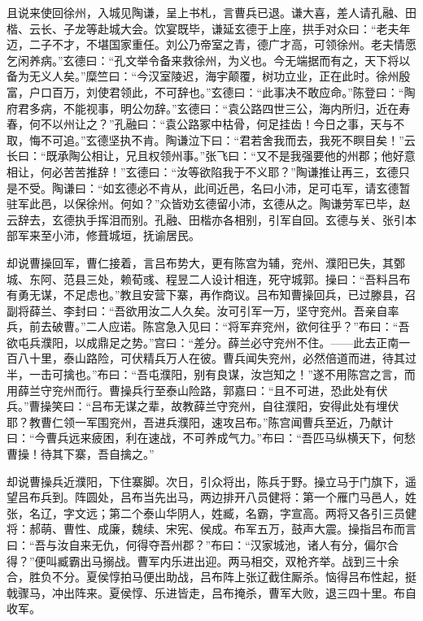 且说来使回徐州，入城见陶谦，呈上书札，言曹兵已退。谦大喜，差人请孔融、田楷、云长、子龙等赴城大会。饮宴既毕，谦延玄德于上座，拱手对众曰：“老夫年迈，二子不才，不堪国家重任。刘公乃帝室之青，德广才高，可领徐州。老夫情愿乞闲养病。”玄德曰：“孔文举令备来救徐州，为义也。今无端据而有之，天下将以备为无义人矣。”糜竺曰：“今汉室陵迟，海宇颠覆，树功立业，正在此时。徐州殷富，户口百万，刘使君领此，不可辞也。”玄德曰：“此事决不敢应命。”陈登曰：“陶府君多病，不能视事，明公勿辞。”玄德曰：“袁公路四世三公，海内所归，近在寿春，何不以州让之？”孔融曰：“袁公路冢中枯骨，何足挂齿！今日之事，天与不取，悔不可追。”玄德坚执不肯。陶谦泣下曰：“君若舍我而去，我死不瞑目矣！”云长曰：“既承陶公相让，兄且权领州事。”张飞曰：“又不是我强要他的州郡；他好意相让，何必苦苦推辞！”玄德曰：“汝等欲陷我于不义耶？”陶谦推让再三，玄德只是不受。陶谦曰：“如玄德必不肯从，此间近邑，名曰小沛，足可屯军，请玄德暂驻军此邑，以保徐州。何如？”众皆劝玄德留小沛，玄德从之。陶谦劳军已毕，赵云辞去，玄德执手挥泪而别。孔融、田楷亦各相别，引军自回。玄德与关、张引本部军来至小沛，修葺城垣，抚谕居民。

却说曹操回军，曹仁接着，言吕布势大，更有陈宫为辅，兖州、濮阳已失，其鄄城、东阿、范县三处，赖荀彧、程昱二人设计相连，死守城郭。操曰：“吾料吕布有勇无谋，不足虑也。”教且安营下寨，再作商议。吕布知曹操回兵，已过滕县，召副将薛兰、李封曰：“吾欲用汝二人久矣。汝可引军一万，坚守兖州。吾亲自率兵，前去破曹。”二人应诺。陈宫急入见曰：“将军弃兖州，欲何往乎？”布曰：“吾欲屯兵濮阳，以成鼎足之势。”宫曰：“差分。薛兰必守兖州不住。——此去正南一百八十里，泰山路险，可伏精兵万人在彼。曹兵闻失兖州，必然倍道而进，待其过半，一击可擒也。”布曰：“吾屯濮阳，别有良谋，汝岂知之！”遂不用陈宫之言，而用薛兰守兖州而行。曹操兵行至泰山险路，郭嘉曰：“且不可进，恐此处有伏兵。”曹操笑曰：“吕布无谋之辈，故教薛兰守兖州，自往濮阳，安得此处有埋伏耶？教曹仁领一军围兖州，吾进兵濮阳，速攻吕布。”陈宫闻曹兵至近，乃献计曰：“今曹兵远来疲困，利在速战，不可养成气力。”布曰：“吾匹马纵横天下，何愁曹操！待其下寨，吾自擒之。”

却说曹操兵近濮阳，下住寨脚。次日，引众将出，陈兵于野。操立马于门旗下，遥望吕布兵到。阵圆处，吕布当先出马，两边排开八员健将：第一个雁门马邑人，姓张，名辽，字文远；第二个泰山华阴人，姓臧，名霸，字宣高。两将又各引三员健将：郝萌、曹性、成廉，魏续、宋宪、侯成。布军五万，鼓声大震。操指吕布而言曰：“吾与汝自来无仇，何得夺吾州郡？”布曰：“汉家城池，诸人有分，偏尔合得？”便叫臧霸出马搦战。曹军内乐进出迎。两马相交，双枪齐举。战到三十余合，胜负不分。夏侯惇拍马便出助战，吕布阵上张辽截住厮杀。恼得吕布性起，挺戟骤马，冲出阵来。夏侯惇、乐进皆走，吕布掩杀，曹军大败，退三四十里。布自收军。

